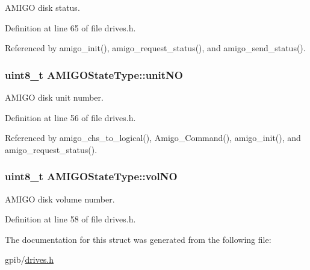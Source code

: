 A\+M\+I\+GO disk status. 



Definition at line 65 of file drives.\+h.



Referenced by amigo\+\_\+init(), amigo\+\_\+request\+\_\+status(), and amigo\+\_\+send\+\_\+status().

\subsubsection[{\texorpdfstring{unit\+NO}{unitNO}}]{\setlength{\rightskip}{0pt plus 5cm}uint8\+\_\+t A\+M\+I\+G\+O\+State\+Type\+::unit\+NO}\hypertarget{structAMIGOStateType_a3d0cc02f8822c817feddf93dd08a5034}{}\label{structAMIGOStateType_a3d0cc02f8822c817feddf93dd08a5034}


A\+M\+I\+GO disk unit number. 



Definition at line 56 of file drives.\+h.



Referenced by amigo\+\_\+chs\+\_\+to\+\_\+logical(), Amigo\+\_\+\+Command(), amigo\+\_\+init(), and amigo\+\_\+request\+\_\+status().

\subsubsection[{\texorpdfstring{vol\+NO}{volNO}}]{\setlength{\rightskip}{0pt plus 5cm}uint8\+\_\+t A\+M\+I\+G\+O\+State\+Type\+::vol\+NO}\hypertarget{structAMIGOStateType_a9825e282ac5844225a43b7f0835da67f}{}\label{structAMIGOStateType_a9825e282ac5844225a43b7f0835da67f}


A\+M\+I\+GO disk volume number. 



Definition at line 58 of file drives.\+h.



The documentation for this struct was generated from the following file\+:\begin{DoxyCompactItemize}
\item 
gpib/\hyperlink{drives_8h}{drives.\+h}\end{DoxyCompactItemize}
